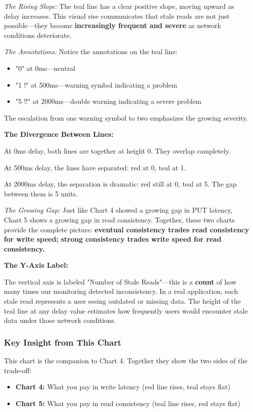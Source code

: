 \documentclass[10pt,a4paper]{article}
\begin{document}
\textit{The Rising Slope:} The teal line has a clear positive slope, moving upward as delay increases. This visual rise communicates that stale reads are not just possible---they become \textbf{increasingly frequent and severe} as network conditions deteriorate.

\textit{The Annotations:} Notice the annotations on the teal line:
\begin{itemize}
    \item "0" at 0ms---neutral
    \item "1 !" at 500ms---warning symbol indicating a problem
    \item "5 !!" at 2000ms---double warning indicating a severe problem
\end{itemize}

The escalation from one warning symbol to two emphasizes the growing severity.

\textbf{The Divergence Between Lines:}

At 0ms delay, both lines are together at height 0. They overlap completely.

At 500ms delay, the lines have separated: red at 0, teal at 1.

At 2000ms delay, the separation is dramatic: red still at 0, teal at 5. The gap between them is 5 units.

\textit{The Growing Gap:} Just like Chart 4 showed a growing gap in PUT latency, Chart 5 shows a growing gap in read consistency. Together, these two charts provide the complete picture: \textbf{eventual consistency trades read consistency for write speed; strong consistency trades write speed for read consistency.}

\textbf{The Y-Axis Label:}

The vertical axis is labeled "Number of Stale Reads"---this is a \textbf{count} of how many times our monitoring detected inconsistency. In a real application, each stale read represents a user seeing outdated or missing data. The height of the teal line at any delay value estimates how frequently users would encounter stale data under those network conditions.

\subsubsection{Key Insight from This Chart}

This chart is the companion to Chart 4. Together they show the two sides of the trade-off:
\begin{itemize}
    \item \textbf{Chart 4:} What you pay in write latency (red line rises, teal stays flat)
    \item \textbf{Chart 5:} What you pay in read consistency (teal line rises, red stays flat)
\end{itemize}
\end{document}
